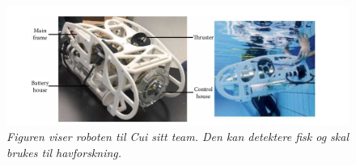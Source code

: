 \begin{figure}
\begin{center} 
\includegraphics[scale=0.45]{figures/auv}
\caption{\small \sl Figuren viser roboten til Cui sitt team. Den kan detektere fisk og skal brukes til havforskning. \cite{Cui m.fl. 2020} \label{fig:auv}} 
\end{center} 
\end{figure} 


